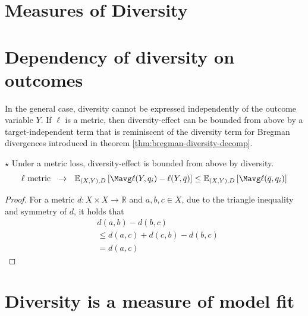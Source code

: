 \documentclass[
    a4paper, %
	fontsize=10pt, %
	twoside=false, %
]{kaobook}
\begin{document}
\begin{titlepage}
\section{Measures of Diversity}
\label{sec:diversity-measures}








\section{Dependency of diversity on outcomes}


In the general case, diversity cannot be expressed independently of the outcome variable $Y$. If $\ell$ is a metric, then diversity-effect can be bounded from above by a target-independent term that is reminiscent of the diversity term for Bregman divergences introduced in theorem \ref{thm:bregman-diversity-decomp}.
\begin{lemma} $\star$ Under a metric loss, diversity-effect is bounded from above by diversity. 
$$
\text{$\ell$ metric}  ~~\rightarrow~~ \mathbb{E}_{(X,Y), D}\left[ \Mavg \ell(Y, q_{i}) - \ell(Y, \bar{q}) \right] 
\leq \mathbb{E}_{(X,Y),D}\left[ \Mavg \ell(\bar{q}, q_{i}) \right] 
$$
\end{lemma}
\begin{proof}
For a metric $d:X \times X \to \mathbb{R}$ and $a,b,c \in X$, due to the triangle inequality and symmetry of $d$, it holds that
\begin{align*}
& d(a,b) - d(b,c)  \\
& \leq d(a,c) + d(c,b) - d(b,c) \\
&= d(a,c)
\end{align*}
\end{proof}

\section{Diversity is a measure of model fit}




\end{titlepage}
\end{document}

